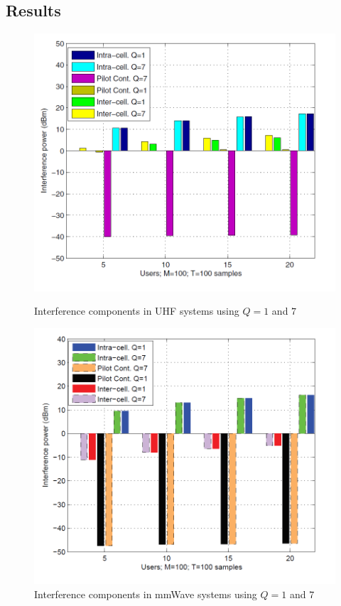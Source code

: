 \documentclass[11pt]{book}
\begin{document}
\subsection{Results}
\begin{figure}
\begin{minipage}{.47\textwidth}
\centering
  \includegraphics[width = \textwidth]{uhf.png}
  \caption{\footnotesize{Interference components in UHF systems using $Q = 1$ and $7$}}
  \label{fig:uhf}
\end{minipage}
\vspace{20mm}
\begin{minipage}{.47\textwidth}
\centering
  \includegraphics[width = \textwidth]{mm.png}
  \caption{\footnotesize{Interference components in mmWave systems using $Q = 1$ and $7$}}
  \label{fig:mm}
\end{minipage}
\end{figure}
\end{document}
